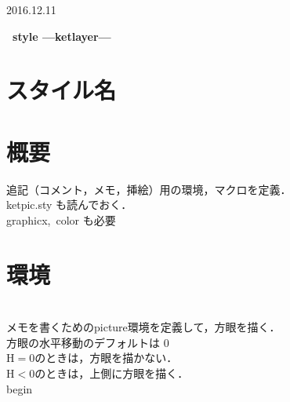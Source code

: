 \documentclass[a4j]{jarticle}
\begin{document}
\begin{flushright}
2016.12.11
\end{flushright}


\begin{center}
{\bf \huge \ketpic\ style ---ketlayer---}\vspace{3mm}\\
\end{center}

\section{スタイル名}

\section{概要}
追記（コメント，メモ，挿絵）用の環境，マクロを定義．\\
\hspace*{5zw}ketpic.sty も読んでおく．\\
\hspace*{5zw}graphicx,\ color も必要

\section{環境}

\\
\tab{}メモを書くためのpicture環境を定義して，方眼を描く．\\
\chuu 方眼の水平移動のデフォルトは 0\\
\chuu $\mathrm{H}=0$のときは，方眼を描かない．\\
\chuu $\mathrm{H}<0$のときは，上側に方眼を描く．\\
\rei \bs begin

\vspace{0.5\baselineskip}

\begin{layerv}{0}{30}

\end{layerv}

\vspace{7\baselineskip}

\end{document}
